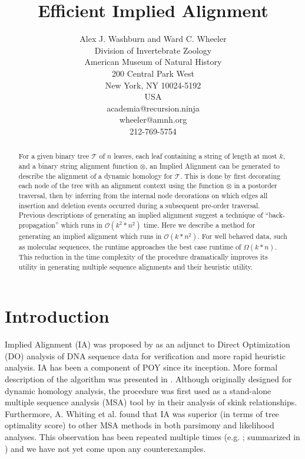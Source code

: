\documentclass[11pt]{article}
\title{ \textbf{Efficient Implied Alignment}}
\author{Alex J. Washburn and Ward C. Wheeler\\
		Division of  Invertebrate Zoology\\
		American Museum of Natural History\\
		200 Central Park West\\
		New York, NY 10024-5192\\
		USA\\
		academia@recursion.ninja\\
		wheeler@amnh.org\\
		212-769-5754}
\begin{document}
\maketitle
\begin{abstract}
For a given binary tree $\mathcal{T}$ of $n$ leaves, each leaf containing a string of length at most $k$, and a binary string alignment function $\otimes$, an Implied Alignment \citep{Wheeler2003} can be generated to describe the alignment of a dynamic homology for $\mathcal{T}$.
This is done by first decorating each node of the tree with an alignment context using the function $\otimes$ in a postorder traversal, then by inferring from the internal node decorations on which edges all insertion and deletion events occurred during a subsequent pre-order traversal.
Previous descriptions of generating an implied alignment suggest a technique of ``back-propagation'' which runs in $\mathcal{O}(k^2 * n^2)$ time.
Here we describe a method for generating an implied alignment which runs in \textsc{$\mathcal{O}(k * n^2)$}.
For well behaved data, such as molecular sequences, the runtime approaches the best case runtime of \textsc{$\Omega(k * n)$}.
This reduction in the time complexity of the procedure dramatically improves its utility in generating multiple sequence alignments and their heuristic utility.
\end{abstract}
\newpage
\tableofcontents
\newpage


\section{Introduction}
Implied Alignment (IA) was proposed by \cite{Wheeler2003} as an adjunct to Direct Optimization (DO) \citep{Wheeler1996,VaronandWheeler2012} analysis of DNA sequence data for verification and more rapid heuristic analysis.
IA has been a component of POY \citep{Wheeleretal2015, POY5} since its inception.
More formal description of the algorithm was presented in \cite{Wheeleretal2006}.
Although originally designed for dynamic homology \citep{Wheeler2001} analysis, the procedure was first used as a stand-alone multiple sequence analysis (MSA) tool by \cite{WhitingAetal2006} in their analysis of skink relationships. 
Furthermore, A. Whiting et al. found that IA was superior (in terms of tree optimality score) to other MSA methods in both parsimony and likelihood analyses.
This observation has been repeated multiple times (e.g. \citealp{LindgrenandDaly2007, FordandWheeler2015}; summarized in \citealp{Wheeler2012}) and we have not yet come upon any counterexamples.
\end{document}
